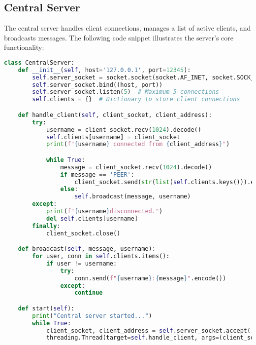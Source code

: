 \documentclass[12pt]{article}
\begin{document}
\subsection{Central Server}
The central server handles client connections, manages a list of active clients, and broadcasts messages. The following code snippet illustrates the server's core functionality:
\begin{lstlisting}[language=Python, caption=Central Server]
class CentralServer:
    def __init__(self, host='127.0.0.1', port=12345):
        self.server_socket = socket.socket(socket.AF_INET, socket.SOCK_STREAM)  
        self.server_socket.bind((host, port))
        self.server_socket.listen(5)  # Maximum 5 connections
        self.clients = {}  # Dictionary to store client connections

    def handle_client(self, client_socket, client_address):
        try:
            username = client_socket.recv(1024).decode()
            self.clients[username] = client_socket
            print(f"{username} connected from {client_address}")

            while True:
                message = client_socket.recv(1024).decode()
                if message == 'PEER':
                    client_socket.send(str(list(self.clients.keys())).encode())
                else:
                    self.broadcast(message, username)
        except:
            print(f"{username}disconnected.")
            del self.clients[username]
        finally:
            client_socket.close()

    def broadcast(self, message, username):
        for user, conn in self.clients.items():
            if user != username:
                try:
                    conn.send(f"{username}:{message}".encode())
                except:
                    continue

    def start(self):
        print("Central server started...")
        while True:
            client_socket, client_address = self.server_socket.accept()
            threading.Thread(target=self.handle_client, args=(client_socket, client_address)).start()
\end{lstlisting}
\end{document}
